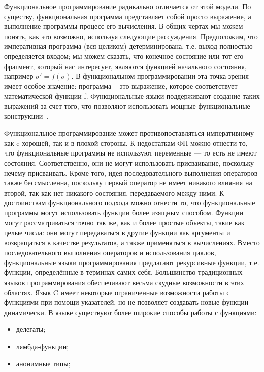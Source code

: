 Функциональное программирование радикально отличается от этой модели. По существу, функциональная программа представляет собой просто выражение, а выполнение программы процесс его вычисления. В общих чертах мы можем понять, как это возможно, используя следующие рассуждения. Предположим, что императивная программа (вся целиком) детерминирована, т.е. выход полностью определяется входом; мы можем сказать, что конечное состояние или тот его фрагмент, который нас интересует, являются функцией начального состояния, например $\sigma' = f(\sigma)$. В функциональном программировании эта точка зрения имеет особое значение: программа – это выражение, которое соответствует математической функции f. Функциональные языки поддерживают создание таких выражений за счет того, что позволяют использовать мощные функциональные конструкции~\cite{intro2fp}.

Функциональное программирование может противопоставляться императивному как c хорошей, так и в плохой стороны. К недостаткам ФП можно отнести то, что функциональные программы не используют переменные --- то есть не имеют состояния. Соответственно, они не могут использовать присваивание, поскольку нечему присваивать. Кроме того, идея последовательного выполнения операторов также бессмысленна, поскольку первый оператор не имеет никакого влияния на второй, так как нет никакого состояния, передаваемого между ними. К достоинствам функционального подхода можно отнести то, что функциональные программы могут использовать функции более изящным способом. Функции могут  рассматриваться	точно	так  же,  как  и  более	простые	объекты,  такие как целые числа: они	могут	передаваться в другие	функции	как аргументы и возвращаться в качестве результатов, а также применяться в вычислениях. Вместо последовательного выполнения операторов и использования циклов, функциональные языки программирования предлагают рекурсивные функции, т.е. функции, определённые в терминах самих себя. Большинство традиционных языков программирования обеспечивают весьма скудные возможности в этих областях. Язык C имеет некоторые ограниченные возможности работы с функциями при помощи указателей, но не позволяет создавать новые функции динамически. В языке \csharp{} существуют более широкие способы работы с функциями:

\begin{itemize}
  \item делегаты;
  \item лямбда-функции;
  \item анонимные типы;
\end{itemize}

